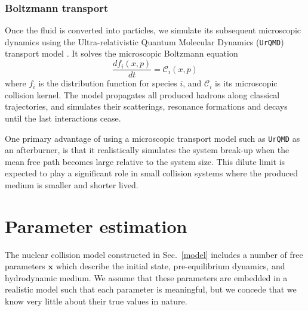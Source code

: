 \documentclass[aps,prc,reprint,amsmath,nofootinbib]{revtex4-1}
\newcommand{\x}{\mathbf{x}}
\begin{document}
\subsubsection{Boltzmann transport}

Once the fluid is converted into particles, we simulate its subsequent microscopic dynamics using the Ultra-relativistic Quantum Molecular Dynamics (\texttt{UrQMD}) transport model \cite{Bass:1998ca, Bleicher:1999xi}.
It solves the microscopic Boltzmann equation
\begin{equation}
  \frac{df_i(x, p)}{dt} = \mathcal{C}_i(x, p)
\end{equation}
where $f_i$ is the distribution function for species $i$, and $\mathcal{C}_i$ is its microscopic collision kernel.
The model propagates all produced hadrons along classical trajectories, and simulates their scatterings, resonance formations and decays until the last interactions cease.

One primary advantage of using a microscopic transport model such as \texttt{UrQMD} as an afterburner, is that it realistically simulates the system break-up when the mean free path becomes large relative to the system size.
This dilute limit is expected to play a significant role in small collision systems where the produced medium is smaller and shorter lived.


\section{Parameter estimation}
\label{calibration}

The nuclear collision model constructed in Sec.~\ref{model} includes a number of free parameters $\x$ which describe the initial state, pre-equilibrium dynamics, and hydrodynamic medium.
We assume that these parameters are embedded in a realistic model such that each parameter is meaningful, but we concede that we know very little about their true values in nature.
\end{document}
